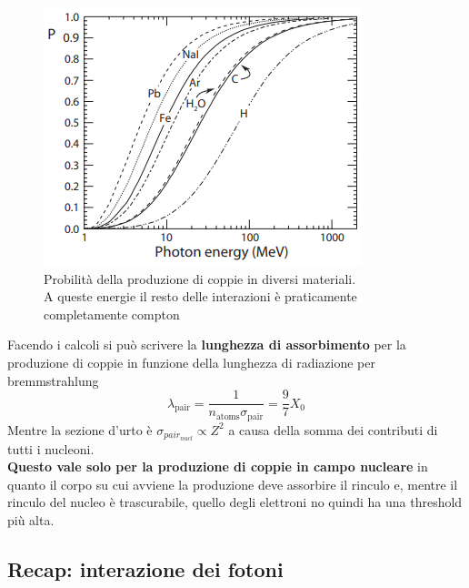\vspace{-10pt}
\hspace{-20pt}
\begin{minipage}{0.48\textwidth}
    \begin{figure}[H]
        \centering
        \includegraphics[width=\textwidth,frame]{Chapters/images/Interazione_radiazione_materia/image-20220220132317352.png}
        \captionsetup{width=\textwidth}
        \caption{Probilità della produzione di coppie in diversi materiali.\\A queste energie il resto delle interazioni è praticamente completamente compton}
        \label{fig:pairmaterials}
    \end{figure}
\end{minipage} \hfill
\begin{minipage}{0.48\textwidth}
    Facendo i calcoli si può scrivere la \textbf{lunghezza di assorbimento} per la produzione di coppie in funzione della lunghezza di radiazione per bremmstrahlung
\[\lambda_{\text{pair}}=\frac{1}{n_{\text{atoms}}\sigma_\text{pair}}=\frac{9}{7}X_0\]
Mentre la sezione d'urto è $\sigma_{pair_{nucl}}\propto Z^2$ a causa della somma dei contributi di tutti i nucleoni.\\
    \textbf{Questo  vale solo per la produzione di coppie  in campo nucleare} in quanto il corpo su cui avviene la produzione deve assorbire il rinculo e, mentre il  rinculo del nucleo è trascurabile, quello degli elettroni no quindi ha una threshold più alta.
\end{minipage}
\subsection*{Recap: interazione dei fotoni}



